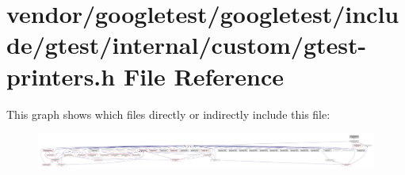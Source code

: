 \hypertarget{internal_2custom_2gtest-printers_8h}{}\section{vendor/googletest/googletest/include/gtest/internal/custom/gtest-\/printers.h File Reference}
\label{internal_2custom_2gtest-printers_8h}
This graph shows which files directly or indirectly include this file\+:
\nopagebreak
\begin{figure}[H]
\begin{center}
\leavevmode
\includegraphics[width=350pt]{internal_2custom_2gtest-printers_8h__dep__incl}
\end{center}
\end{figure}
